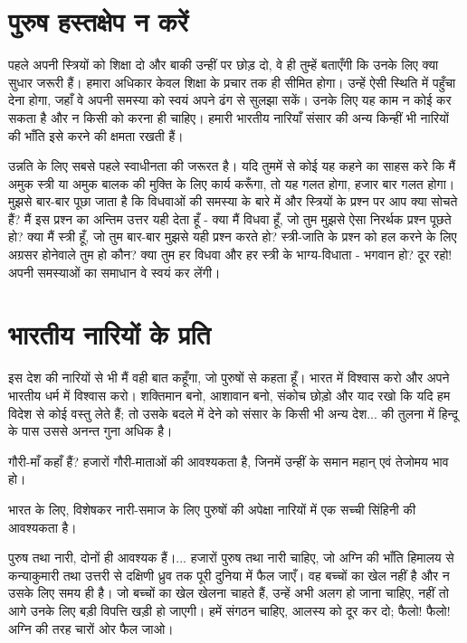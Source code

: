 \section*{पुरुष हस्तक्षेप न करें}


पहले अपनी स्त्रियों को शिक्षा दो और बाकी उन्हीं पर छोड़ दो, वे ही तुम्हें बताएँगी कि उनके लिए क्या सुधार जरूरी हैं। हमारा अधिकार केवल शिक्षा के प्रचार तक ही सीमित होगा। उन्हें ऐसी स्थिति में पहुँचा देना होगा, जहाँ वे अपनी समस्या को स्वयं अपने ढंग से सुलझा सकें। उनके लिए यह काम न कोई कर सकता है और न किसी को करना ही चाहिए। हमारी भारतीय नारियाँ संसार की अन्य किन्हीं भी नारियों की भाँति इसे करने की क्षमता रखती हैं। 

उन्नति के लिए सबसे पहले स्वाधीनता की जरूरत है। यदि तुममें से कोई यह कहने का साहस करे कि मैं अमुक स्त्री या अमुक बालक की मुक्ति के लिए कार्य करूँगा, तो यह गलत होगा, हजार बार गलत होगा। मुझसे बार-बार पूछा जाता है कि विधवाओं की समस्या के बारे में और स्त्रियों के प्रश्न पर आप क्या सोचते हैं? मैं इस प्रश्न का अन्तिम उत्तर यही देता हूँ - क्या मैं विधवा हूँ, जो तुम मुझसे ऐसा निरर्थक प्रश्न पूछते हो? क्या मैं स्त्री हूँ, जो तुम बार-बार मुझसे यही प्रश्न करते हो? स्त्री-जाति के प्रश्न को हल करने के लिए अग्रसर होनेवाले तुम हो कौन? क्या तुम हर विधवा और हर स्त्री के भाग्य-विधाता - भगवान हो? दूर रहो! अपनी समस्याओं का समाधान वे स्वयं कर लेंगी।


\section*{भारतीय नारियों के प्रति}


इस देश की नारियों से भी मैं वही बात कहूँगा, जो पुरुषों से कहता हूँ। भारत में विश्वास करो और अपने भारतीय धर्म में विश्वास करो। शक्तिमान बनो, आशावान बनो, संकोच छोड़ो और याद रखो कि यदि हम विदेश से कोई वस्तु लेते हैं; तो उसके बदले में देने को संसार के किसी भी अन्य देश... की तुलना में हिन्दू के पास उससे अनन्त गुना अधिक है। 

गौरी-माँ कहाँ हैं? हजारों गौरी-माताओं की आवश्यकता है, जिनमें उन्हीं के समान महान् एवं तेजोमय भाव हो। 

भारत के लिए, विशेषकर नारी-समाज के लिए पुरुषों की अपेक्षा नारियों में एक सच्ची सिंहिनी की आवश्यकता है। 

पुरुष तथा नारी, दोनों ही आवश्यक हैं।... हजारों पुरुष तथा नारी चाहिए, जो अग्नि की भाँति हिमालय से कन्याकुमारी तथा उत्तरी से दक्षिणी ध्रुव तक पूरी दुनिया में फैल जाएँ। वह बच्चों का खेल नहीं है और न उसके लिए समय ही है। जो बच्चों का खेल खेलना चाहते हैं, उन्हें अभी अलग हो जाना चाहिए, नहीं तो आगे उनके लिए बड़ी विपत्ति खड़ी हो जाएगी। हमें संगठन चाहिए, आलस्य को दूर कर दो; फैलो! फैलो! अग्नि की तरह चारों ओर फैल जाओ। 

